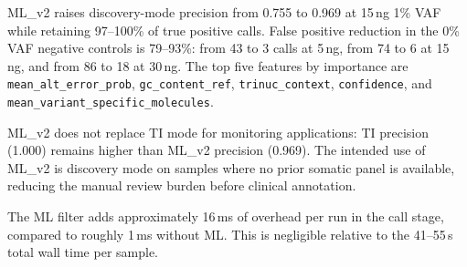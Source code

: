 ML\_v2 raises discovery-mode precision from 0.755 to 0.969 at 15\,ng 1\% VAF
while retaining 97--100\% of true positive calls.
False positive reduction in the 0\% VAF negative controls is 79--93\%: from
43 to 3 calls at 5\,ng, from 74 to 6 at 15\,ng, and from 86 to 18 at 30\,ng.
The top five features by importance are \texttt{mean\_alt\_error\_prob},
\texttt{gc\_content\_ref}, \texttt{trinuc\_context}, \texttt{confidence}, and
\texttt{mean\_variant\_specific\_molecules}.

ML\_v2 does not replace TI mode for monitoring applications: TI precision (1.000)
remains higher than ML\_v2 precision (0.969).
The intended use of ML\_v2 is discovery mode on samples where no prior somatic
panel is available, reducing the manual review burden before clinical annotation.

The ML filter adds approximately 16\,ms of overhead per run in the call stage,
compared to roughly 1\,ms without ML. This is negligible relative to the
41--55\,s total wall time per sample.
